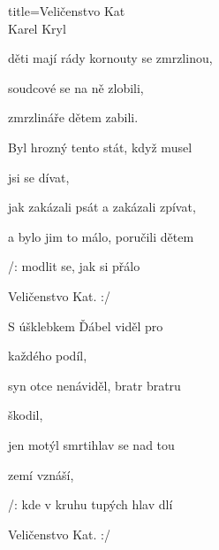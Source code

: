 \begin{song}{title=\predtitle\centering Veličenstvo Kat \\\large Karel Kryl  \vspace*{-0.3cm}}
{\begin{centerjustified}
\begin{varwidth}[t]{0.55\textwidth}
 	děti mají rády kornouty se zmrzlinou,
  
  	soudcové se na ně zlobili,
   
   	zmrzlináře dětem zabili.


\end{varwidth}\mezisloupci\begin{varwidth}[t]{0.55\textwidth}\setlength{\parindent}{\pindent}\vspace*{0.55cm}  %

\sloka
	Byl hrozný tento stát, když musel 

	jsi se dívat,
   
   	jak zakázali psát a zakázali zpívat,
   
   	a bylo jim to málo, poručili dětem
   
   	/: modlit se, jak si přálo 

	Veličenstvo Kat. :/

\sloka
	S úšklebkem Ďábel viděl pro 

	každého podíl,
  
  	syn otce nenáviděl, bratr bratru 

	škodil,
   
   	jen motýl smrtihlav se nad tou 

	zemí vznáší,
   
   	/: kde v kruhu tupých hlav dlí 

	Veličenstvo Kat. :/


\end{varwidth}

\end{centerjustified}
}
\setcounter{Slokočet}{0}
\end{song}

